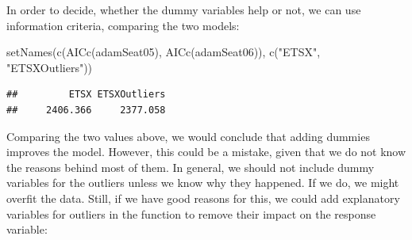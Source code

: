 \documentclass[
]{book}
\newenvironment{Shaded}{\begin{snugshade}}{\end{snugshade}}
\newcommand{\AttributeTok}[1]{\textcolor[rgb]{0.77,0.63,0.00}{#1}}
\newcommand{\CommentTok}[1]{\textcolor[rgb]{0.56,0.35,0.01}{\textit{#1}}}
\newcommand{\DecValTok}[1]{\textcolor[rgb]{0.00,0.00,0.81}{#1}}
\newcommand{\FunctionTok}[1]{\textcolor[rgb]{0.00,0.00,0.00}{#1}}
\newcommand{\NormalTok}[1]{#1}
\newcommand{\OtherTok}[1]{\textcolor[rgb]{0.56,0.35,0.01}{#1}}
\newcommand{\SpecialCharTok}[1]{\textcolor[rgb]{0.00,0.00,0.00}{#1}}
\newcommand{\StringTok}[1]{\textcolor[rgb]{0.31,0.60,0.02}{#1}}
\theoremstyle{definition}
\theoremstyle{definition}
\theoremstyle{definition}
\theoremstyle{definition}
\theoremstyle{remark}
\begin{document}
\begin{Shaded}
\end{Shaded}

In order to decide, whether the dummy variables help or not, we can use information criteria, comparing the two models:

\begin{Shaded}
\begin{Highlighting}[]
\FunctionTok{setNames}\NormalTok{(}\FunctionTok{c}\NormalTok{(}\FunctionTok{AICc}\NormalTok{(adamSeat05), }\FunctionTok{AICc}\NormalTok{(adamSeat06)),}
         \FunctionTok{c}\NormalTok{(}\StringTok{"ETSX"}\NormalTok{, }\StringTok{"ETSXOutliers"}\NormalTok{))}
\end{Highlighting}
\end{Shaded}

\begin{verbatim}
##         ETSX ETSXOutliers 
##     2406.366     2377.058
\end{verbatim}

Comparing the two values above, we would conclude that adding dummies improves the model. However, this could be a mistake, given that we do not know the reasons behind most of them. In general, we should not include dummy variables for the outliers unless we know why they happened. If we do, we might overfit the data. Still, if we have good reasons for this, we could add explanatory variables for outliers in the function to remove their impact on the response variable:
\end{document}
